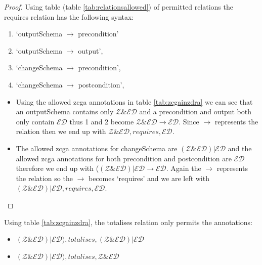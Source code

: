 \begin{proof}
Using table (table \ref{tab:relationsallowed}) of permitted relations the
requires relation has the following syntax:
\begin{enumerate}
\item `outputSchema $\longrightarrow$ precondition'
\item `outputSchema $\longrightarrow$ output', 
\item `changeSchema $\longrightarrow$ precondition', 
\item `changeSchema $\longrightarrow$ postcondition', 
\end{enumerate} 
\begin{itemize}

\item Using the allowed \gls{zcga} annotations in table \ref{tab:zcgainzdra} we
can see that an outputSchema contains only $\mathcal{Z} \& \mathcal{ED}$ and a
precondition and output both only contain $\mathcal{ED}$ thus 1 and 2 become
$\mathcal{Z} \& \mathcal{ED} \longrightarrow \mathcal{ED}$. Since
$\longrightarrow$ represents the relation then we end up with $\mathcal{Z} \&
\mathcal{ED}, requires, \mathcal{ED}$.

\item The allowed \gls{zcga} annotations for changeSchema are $(\mathcal{Z} \&
\mathcal{ED}) | \mathcal{ED}$ and the allowed \gls{zcga} annotations for both
precondition and postcondition are $\mathcal{ED}$ therefore we end up with
($(\mathcal{Z} \& \mathcal{ED}) | \mathcal{ED} \longrightarrow \mathcal{ED}$.
Again the $\longrightarrow$ represents the relation so the $\longrightarrow$
becomes `requires' and we are left with $(\mathcal{Z} \& \mathcal{ED}) |
\mathcal{ED}, requires, \mathcal{ED}$.
\end{itemize}
\end{proof}

\begin{thm}
Using table \ref{tab:zcgainzdra}, the totalises relation only permits the
annotations:
\begin{itemize}
\item $(\mathcal{Z} \& \mathcal{ED}) | \mathcal{ED}), totalises, (\mathcal{Z} \&
\mathcal{ED}) | \mathcal{ED}$
\item $(\mathcal{Z} \& \mathcal{ED}) | \mathcal{ED}), totalises, \mathcal{Z} \&
\mathcal{ED}$
\end{itemize}
\end{thm}

